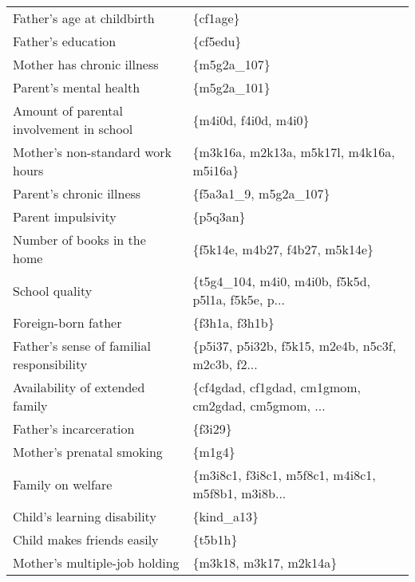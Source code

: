 \begin{tabular}{ll}
                   Father's age at childbirth &                                           \{cf1age\} \\
                           Father's education &                                           \{cf5edu\} \\
                   Mother has chronic illness &                                        \{m5g2a\_107\} \\
                       Parent's mental health &                                        \{m5g2a\_101\} \\
     Amount of parental involvement in school &                               \{m4i0d, f4i0d, m4i0\} \\
             Mother's non-standard work hours &           \{m3k16a, m2k13a, m5k17l, m4k16a, m5i16a\} \\
                     Parent's chronic illness &                              \{f5a3a1\_9, m5g2a\_107\} \\
                           Parent impulsivity &                                           \{p5q3an\} \\
                  Number of books in the home &                     \{f5k14e, m4b27, f4b27, m5k14e\} \\
                               School quality &  \{t5g4\_104, m4i0, m4i0b, f5k5d, p5l1a, f5k5e, p... \\
                          Foreign-born father &                                     \{f3h1a, f3h1b\} \\
    Father's sense of familial responsibility &  \{p5i37, p5i32b, f5k15, m2e4b, n5c3f, m2c3b, f2... \\
              Availability of extended family &  \{cf4gdad, cf1gdad, cm1gmom, cm2gdad, cm5gmom, ... \\
                       Father's incarceration &                                            \{f3i29\} \\
                    Mother's prenatal smoking &                                             \{m1g4\} \\
                            Family on welfare &  \{m3i8c1, f3i8c1, m5f8c1, m4i8c1, m5f8b1, m3i8b... \\
                  Child's learning disability &                                         \{kind\_a13\} \\
                   Child makes friends easily &                                            \{t5b1h\} \\
                Mother's multiple-job holding &                             \{m3k18, m3k17, m2k14a\} \\

\end{tabular}

